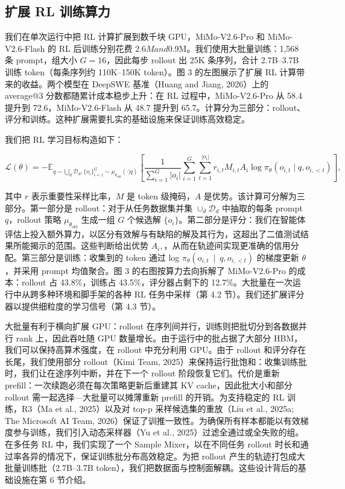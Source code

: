 \documentclass[
  10
]{article}
\begin{document}
\subsection{扩展 RL 训练算力}\label{scaling-rl-training-computation}

我们在单次运行中把 RL 计算扩展到数千块 GPU，MiMo-V2.6-Pro 和 MiMo-V2.6-Flash 的 RL 后训练分别花费 $2.6M and $0.9M。我们使用大批量训练：1,568 条 prompt，组大小 $G=16$，因此每步 rollout 出 25K 条序列，合计 2.7B--3.7B 训练 token（每条序列约 110K--150K token）。图 3 的左图展示了扩展 RL 计算带来的收益。两个模型在 DeepSWE 基准（Huang and Jiang, 2026）上的 average@3 分数都随累计成本稳步上升：在 RL 过程中，MiMo-V2.6-Pro 从 58.4 提升到 72.6，MiMo-V2.6-Flash 从 48.7 提升到 65.7。计算分为三部分：rollout、评分和训练。这种扩展需要扎实的基础设施来保证训练高效稳定。

我们把 RL 学习目标构造如下：

\[
\mathcal {L} (\theta) = - \mathbb {E} _ {q \sim \bigcup_ {d} \mathcal {D} _ {d}, \{o _ {i} \} _ {i = 1} ^ {G} \sim \mu_ {\theta_ {\mathrm {old}}} (\cdot | q)} \left[ \frac {1}{\sum_ {i = 1} ^ {G} | o _ {i} |} \sum_ {i = 1} ^ {G} \sum_ {t = 1} ^ {| o _ {i} |} r _ {i, t} M _ {i, t} A _ {i} \log \pi_ {\theta} (o _ {i, t} \mid q, o _ {i, < t}) \right],\tag{1}
\]

其中 $r$ 表示重要性采样比率，$M$ 是 token 级掩码，$A$ 是优势。该计算可分解为三部分。第一部分是 rollout：对于从任务数据集并集 \(\cup _ { d } \mathcal { D } _ { d }\) 中抽取的每条 prompt $q$，rollout 策略 \(\mu _ { \theta _ { \mathrm { o l d } } }\) 生成一组 $G$ 个候选解 $\{o_i\}$。第二部分是评分：我们在智能体评估上投入额外算力，以区分有效解与有缺陷的解及其行为，这超出了二值测试结果所能揭示的范围。这些判断给出优势 \(A _ { i } ,\)，从而在轨迹间实现更准确的信用分配。第三部分是训练：收集到的 token 通过 log \(\pi _ { \theta } ( o _ { i , t } ~ \mid ~ q , o _ { i , < t } )\) 的梯度更新 $\theta$，并采用 prompt 均值聚合。图 3 的右图按算力去向拆解了 MiMo-V2.6-Pro 的成本：rollout 占 43.8\%，训练占 43.5\%，评分器占剩下的 12.7\%。大批量在一次运行中从跨多种环境和脚手架的各种 RL 任务中采样（第 4.2 节）。我们还扩展评分器以提供细粒度的学习信号（第 4.3 节）。



大批量有利于横向扩展 GPU：rollout 在序列间并行，训练则把批切分到各数据并行 rank 上，因此吞吐随 GPU 数量增长。由于运行中的批占据了大部分 HBM，我们可以保持高算术强度，在 rollout 中充分利用 GPU。由于 rollout 和评分存在长尾，我们使用部分 rollout（Kimi Team, 2025）来保持运行批饱和：收集训练批时，我们让在途序列中断，并在下一个 rollout 阶段恢复它们。代价是重新 prefill：一次续跑必须在每次策略更新后重建其 KV cache，因此批大小和部分 rollout 需一起选择---大批量可以摊薄重新 prefill 的开销。为支持稳定的 RL 训练，R3（Ma et al., 2025）以及对 top-p 采样候选集的重放（Liu et al., 2025a; The Microsoft AI Team, 2026）保证了训推一致性。为确保所有样本都能以有效梯度参与训练，我们引入动态采样器（Yu et al., 2025）过滤全通过或全失败的组。在多任务 RL 中，我们实现了一个 Sample Mixer，以在不同任务 rollout 时长和通过率各异的情况下，保证训练批分布高效稳定。为把 rollout 产生的轨迹打包成大批量训练批（2.7B--3.7B token），我们把数据面与控制面解耦。这些设计背后的基础设施在第 6 节介绍。
\end{document}
